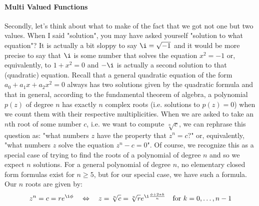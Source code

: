 \paragraph{Multi Valued Functions}
Secondly, let's think about what to make of the fact that we got not one but two values. When I said "solution", you may have asked yourself "solution to what equation"? It is actually a bit sloppy to say $\i = \sqrt{-1}$ and it would be more precise to say that $\i$ is some number that solves the equation $x^2 = -1$ or, equivalently, to  $1 + x^2 = 0$ and $-\i$ is actually a second solution to that (quadratic) equation. Recall that a general quadratic equation of the form $a_0 + a_1 x + a_2 x^2 = 0$  always has two solutions given by the quadratic formula and that in general, according to the fundamental theorem of algebra, a polynomial $p(z)$ of degree $n$ has exactly $n$ complex roots (i.e. solutions to $p(z) = 0$) when we count them with their respective multiplicities. When we are asked to take an $n$th root of some number $c$, i.e. we want to compute $\sqrt[n]{c}$, we can rephrase this question as: "what numbers $z$ have the property that $z^n = c$?" or, equivalently, "what numbers $z$ solve the equation $z^n - c = 0$". Of course, we recognize this as a special case of trying to find the roots of a polynomial of degree $n$ and so we expect $n$ solutions. For a general polynomial of degree $n$, no elementary closed form formulas exist for $n \geq 5$, but for our special case, we have such a formula. Our $n$ roots are given by:
\begin{equation}
 z^n = c = r e^{\i \phi} \quad \Leftrightarrow \quad
 z = \sqrt[n]{c} = \sqrt[n]{r} e^{\i \frac{\phi + 2 \pi k}{n}} \quad \text{for } k = 0,\ldots,n-1
\end{equation}
